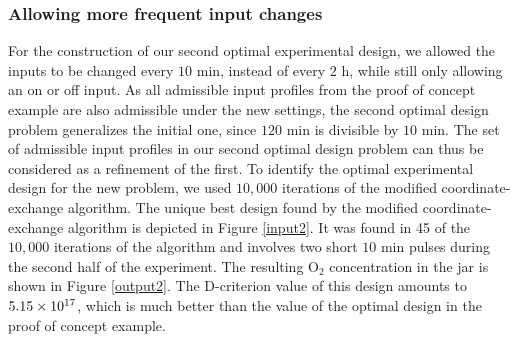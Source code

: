 \subsubsection{Allowing more frequent input changes}
\label{Experiment2}
For the construction of our second optimal experimental design, we allowed the inputs to be changed every $10 \text{ min}$, instead of every $2 \text{ h}$, while still only allowing an on or off input. As all admissible input profiles from the proof of concept example are also admissible under the new settings, the second optimal design problem generalizes the initial one, since $120 \text{ min}$ is divisible by $10 \text{ min}$. The set of admissible input profiles in our second optimal design problem can thus be considered as a refinement of the first. To identify the optimal experimental design for the new problem, we used $10, 000$ iterations of the modified coordinate-exchange algorithm. The unique best design found by the modified coordinate-exchange algorithm is depicted in Figure \ref{input2}. It was found in 45 of the $10, 000$ iterations of the algorithm and involves two short $10 \text{ min}$ pulses during the second half of the experiment. The resulting $\text{O}_2$ concentration in the jar is shown in Figure \ref{output2}. The D-criterion value of this design amounts to $5.15\times 10^{17}$, which is much better than the value of the optimal design in the proof of concept example.
